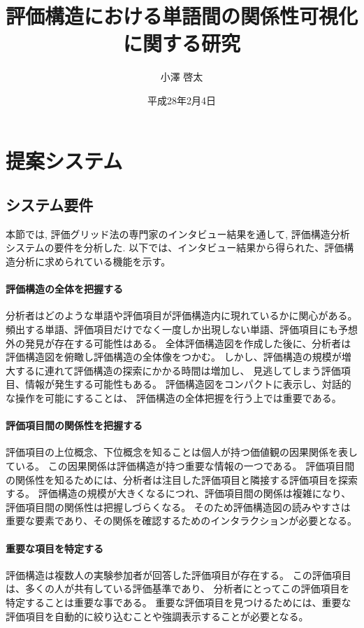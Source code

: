 \documentclass[syuuron]{kuee}
\title{評価構造における単語間の関係性可視化に関する研究}
\author{小澤 啓太}
\date{平成28年2月4日}
\begin{document}
\maketitle
\tableofcontents



\chapter{提案システム}
	\section{システム要件}
		本節では, 評価グリッド法の専門家のインタビュー結果\cite{hak1}を通して, 評価構造分析システムの要件を分析した. 
		以下では、インタビュー結果から得られた、評価構造分析に求められている機能を示す。
		\subsubsection{評価構造の全体を把握する}
			分析者はどのような単語や評価項目が評価構造内に現れているかに関心がある。
			頻出する単語、評価項目だけでなく一度しか出現しない単語、評価項目にも予想外の発見が存在する可能性はある。
			全体評価構造図を作成した後に、分析者は評価構造図を俯瞰し評価構造の全体像をつかむ。
			しかし、評価構造の規模が増大するに連れて評価構造の探索にかかる時間は増加し、
			見逃してしまう評価項目、情報が発生する可能性もある。
			評価構造図をコンパクトに表示し、対話的な操作を可能にすることは、
			評価構造の全体把握を行う上では重要である。
		\subsubsection{評価項目間の関係性を把握する}
			評価項目の上位概念、下位概念を知ることは個人が持つ価値観の因果関係を表している。
			この因果関係は評価構造が持つ重要な情報の一つである。
			評価項目間の関係性を知るためには、分析者は注目した評価項目と隣接する評価項目を探索する。
			評価構造の規模が大きくなるにつれ、評価項目間の関係は複雑になり、評価項目間の関係性は把握しづらくなる。
			そのため評価構造図の読みやすさは重要な要素であり、その関係を確認するためのインタラクションが必要となる。
		\subsubsection{重要な項目を特定する}
			評価構造は複数人の実験参加者が回答した評価項目が存在する。
			この評価項目は、多くの人が共有している評価基準であり、
			分析者にとってこの評価項目を特定することは重要な事である。
			重要な評価項目を見つけるためには、重要な評価項目を自動的に絞り込むことや強調表示することが必要となる。
\end{document}
